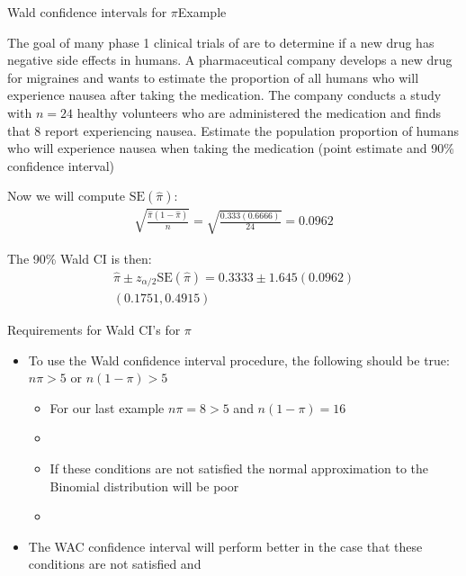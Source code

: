 \documentclass[xcolor=dvipsnames]{beamer}
\begin{document}
\begin{frame}{Wald confidence intervals for $\pi$}{Example}
	\begin{itemize} {\tiny
		\item The goal of many phase 1 clinical trials of are to determine if a new drug has negative side effects in humans. A pharmaceutical company develops a new drug for migraines and wants to estimate the proportion of all humans who will experience nausea after taking the medication. The company conducts a study with $n = 24$ healthy volunteers who are administered the medication and finds that 8 report experiencing nausea. Estimate the population proportion of humans who will experience nausea when taking the medication (point estimate and 90\% confidence interval) }  \pause
		\item Now we will compute $\text{SE}(\hat{\pi})$:  \pause
		\begin{gather*}
		\sqrt{\frac{\hat{\pi}(1-\hat{\pi})}{n}} = \sqrt{\frac{0.333(0.6666)}{24}} = 0.0962
		\end{gather*} \pause
		\item The 90\% Wald CI is then:  \pause
		\begin{gather*}
		\hat{\pi} \pm z_{\alpha/2} \text{SE}(\hat{\pi}) = 0.3333 \pm 1.645 ( 0.0962) \\
		(0.1751, 0.4915)
		\end{gather*}
	\end{itemize}
\end{frame}

\begin{frame}{Requirements for Wald CI's for $\pi$}
	\begin{itemize}
		\item To use the Wald confidence interval procedure, the following should be true: $n \pi > 5$ or $n(1-\pi) > 5$  \pause
		\begin{itemize}
			\item For our last example $n \pi = 8 > 5$ and $n(1-\pi) = 16$  \pause
			\item[]
			\item If these conditions are not satisfied the normal approximation to the Binomial distribution will be poor  \pause
			\item[]
		\end{itemize}
		\item The WAC confidence interval will perform better in the case that these conditions are not satisfied and 
	\end{itemize}
\end{frame}
\end{document}
